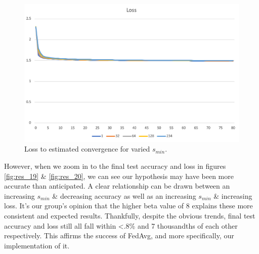 \documentclass[../mthe-493-final-project.tex]{subfiles}
\begin{document}
    \begin{figure}
        \centering
        \includegraphics[width=140mm]{thesis/img/res_18.png}
        \caption{Loss to estimated convergence for varied $s_{min}$.}
        \label{fig:res_18}
    \end{figure}
    
    However, when we zoom in to the final test accuracy and loss in figures \ref{fig:res_19} \& \ref{fig:res_20}, we can see our hypothesis may have been more accurate than anticipated. A clear relationship can be drawn between an increasing $s_{min}$ \& decreasing accuracy as well as an increasing $s_{min}$ \& increasing loss. It’s our group’s opinion that the higher beta value of 8 explains these more consistent and expected results. Thankfully, despite the obvious trends, final test accuracy and loss still all fall within <.8\% and 7 thousandths of each other respectively. This affirms the success of FedAvg, and more specifically, our implementation of it.
    
\end{document}
